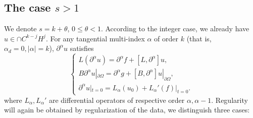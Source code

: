 \documentclass[10pt]{amsart}
\theoremstyle{definition}\newtheorem{defi}[theo]{Definition}\newtheorem{rema}[theo]{Remark}\newtheorem{exam}[theo]{Example}\newtheorem{exem}[theo]{Example}\newtheorem{nota}[theo]{Notation}
\begin{document}
\subsection{The case $s>1$}
We denote $s=k+\theta$, $0\leq \theta<1$. According to the integer case, we already have $u\in \cap C^{k-j}H^j$. For any tangential multi-index $\alpha$ of order $k$ (that is, $\alpha_d=0,|\alpha|=k$), $\partial^\alpha u$ satisfies
\begin{equation}\label{derBVP}
\left\{
\begin{array}{ll}
L(\partial^\alpha u)=\partial^\alpha f+[L,\partial^\alpha]u,\\
B\partial^\alpha u|_{\partial\Omega}=\partial^\alpha g+[B,\partial^\alpha]u|_{\partial\Omega},\\
\partial^\alpha u|_{t=0}=L_\alpha (u_0)+ L_\alpha' (f)|_{t=0}.
\end{array}
\right.
\end{equation}
where $L_\alpha,L_\alpha'$ are differential operators of respective order $\alpha,\alpha-1$. Regularity will again be obtained by regularization of the data, we distinguish three cases:
\end{document}

